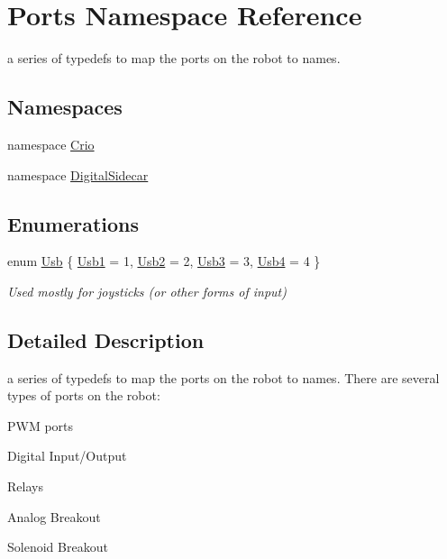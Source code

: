 \hypertarget{namespace_ports}{\section{\-Ports \-Namespace \-Reference}
\label{namespace_ports}
}


a series of typedefs to map the ports on the robot to names.  


\subsection*{\-Namespaces}
\begin{DoxyCompactItemize}
\item 
namespace \hyperlink{namespace_ports_1_1_crio}{\-Crio}
\item 
namespace \hyperlink{namespace_ports_1_1_digital_sidecar}{\-Digital\-Sidecar}
\end{DoxyCompactItemize}
\subsection*{\-Enumerations}
\begin{DoxyCompactItemize}
\item 
enum \hyperlink{namespace_ports_a75eeb68b25771e471390419d37f86153}{\-Usb} \{ \hyperlink{namespace_ports_a75eeb68b25771e471390419d37f86153a4ffca7220ba866e9cd5c250e361e0e9f}{\-Usb1} =  1, 
\hyperlink{namespace_ports_a75eeb68b25771e471390419d37f86153aad81504cc24351cc2c12ba1140b93d81}{\-Usb2} =  2, 
\hyperlink{namespace_ports_a75eeb68b25771e471390419d37f86153ab5ce69d5a47cbc3b7762a85cab8e3f98}{\-Usb3} =  3, 
\hyperlink{namespace_ports_a75eeb68b25771e471390419d37f86153ae908024b60a7047f9ac041926fa48581}{\-Usb4} =  4
 \}
\begin{DoxyCompactList}\small\item\em \-Used mostly for joysticks (or other forms of input) \end{DoxyCompactList}\end{DoxyCompactItemize}


\subsection{\-Detailed \-Description}
a series of typedefs to map the ports on the robot to names. \-There are several types of ports on the robot\-:
\begin{DoxyItemize}
\item \-P\-W\-M ports
\item \-Digital \-Input/\-Output
\item \-Relays
\item \-Analog \-Breakout
\item \-Solenoid \-Breakout
\end{DoxyItemize}

